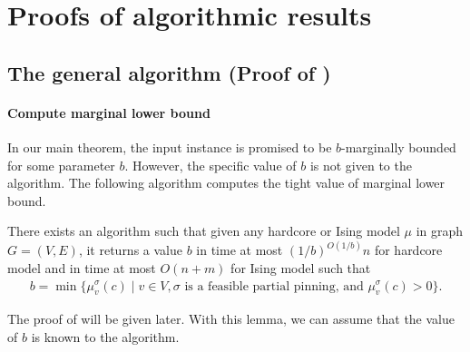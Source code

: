 \section{Proofs of algorithmic results}\label{sec:proof-main}

\subsection{The general algorithm (Proof of \texorpdfstring{}{Lg})}\label{sec:proof-gen}

\paragraph{Compute marginal lower bound}
In our main theorem, the input instance is promised to be $b$-marginally bounded for some parameter $b$. However, the specific value of $b$ is not given to the algorithm. The following algorithm computes the tight value of marginal lower bound.  
\begin{lemma}\label{lem:alg-b}
There exists an algorithm such that given any hardcore or Ising model $\mu$ in graph $G=(V,E)$, %
it returns a value $b$ in time at most $(1/b)^{O(1/b)} n$ for hardcore model and in time at most $O(n+m)$ for Ising model such that 
\begin{align}\label{eq:def-b}
    b = \min \{\mu^\sigma_v(c) \mid v\in V, \sigma \text{ is a feasible partial pinning, and } \mu^\sigma_v(c) > 0 \}.
\end{align}
\end{lemma}
The proof of  will be given later. With this lemma, we can assume that the value of $b$ is known to the algorithm. 


